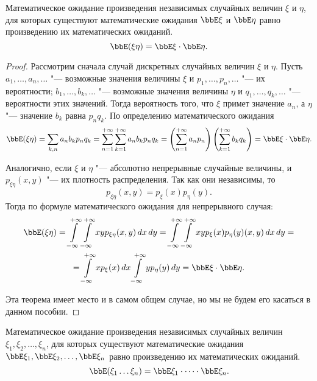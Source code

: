 \begin{thm}[мультипликативность]
Математическое ожидание произведения независимых случайных величин $\xi$ и $\eta$, для которых существуют математические ожидания $\bbE\xi$ и $\bbE\eta$ равно произведению их математических ожиданий.
$$
\bbE (\xi\eta)=\bbE\xi\cdot \bbE\eta.
$$
\end{thm}
\begin{proof}
Рассмотрим сначала случай дискретных случайных величин $\xi$ и $\eta$. Пусть $a_1,\dots,a_n,\dots$ "--- возможные значения величины $\xi$ и $p_1,\dots,p_n,\dots$ "--- их вероятности; $b_1,\dots,b_k,\dots$ "--- возможные значения величины $\eta$ и $q_1,\dots,q_k,\dots$ "--- вероятности этих значений. Тогда вероятность того, что $\xi$ примет значение $a_n$, а $\eta$ "--- значение $b_k$ равна $p_n q_k$. По определению математического ожидания 
$$
\bbE(\xi\eta)=\sum\limits_{k,n}a_n b_k p_n q_k = \sum\limits_{n=1}^{+\infty}\sum\limits_{k=1}^{+\infty} a_n b_k p_n q_k =\left(\sum\limits_{n=1}^{+\infty}a_n p_n\right)\left(\sum\limits_{k=1}^{+\infty}b_k q_k\right)=\bbE\xi\cdot \bbE\eta.
$$

Аналогично, если $\xi$ и $\eta$ "--- абсолютно непрерывные случайные величины, и $p_{\xi\eta}(x,y)$ "--- их плотность распределения. Так как они независимы, то
$$
p_{\xi\eta}(x,y)=p_\xi(x)p_\eta(y).
$$
Тогда по формуле математического ожидания для непрерывного случая:
\begin{multline*}
\bbE(\xi\eta)=\int\limits_{-\infty}^{+\infty}\int\limits_{-\infty}^{+\infty}xyp_{\xi\eta}(x,y)\,dx\,dy=\int\limits_{-\infty}^{+\infty}\int\limits_{-\infty}^{+\infty}xyp_\xi(x)p_\eta(y)(x,y)\,dx\,dy=\\=\int\limits_{-\infty}^{+\infty}xp_\xi(x)\,dx\int\limits_{-\infty}^{+\infty}yp_\eta(y)\,dy=\bbE\xi\cdot \bbE\eta.
\end{multline*}

Эта теорема имеет место и в самом общем случае, но мы не будем его касаться в данном пособии.
\end{proof}
\begin{cons}
Математическое ожидание произведения независимых случайных величин $\xi_1,\xi_2,\dots, \xi_n$, для которых существуют математические ожидания $\bbE\xi_1,\bbE\xi_2,\dots, \bbE\xi_n$ равно произведению их математических ожиданий.
$$
\bbE (\xi_1\dots\xi_n)=\bbE\xi_1\cdot\dots\cdot \bbE\xi_n.
$$
\end{cons}

